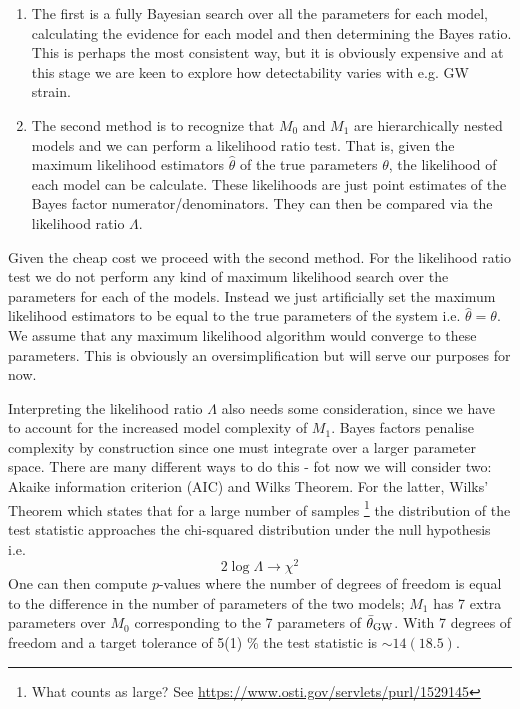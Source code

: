 \documentclass[fleqn,usenatbib,useAMS]{mnras}
\begin{document}
\begin{enumerate}
	\item The first is a fully Bayesian search over all the parameters for each model, calculating the evidence for each model and then determining the Bayes ratio. This is perhaps the most consistent way, but it is obviously expensive and at this stage we are keen to explore how detectability varies with e.g. GW strain.
	\item The second method is to recognize that $M_0$ and $M_1$ are hierarchically nested models and we can perform a likelihood ratio test. That is, given the maximum likelihood estimators $\hat{\theta}$ of the true parameters $\theta$, the likelihood of each model can be calculate. These likelihoods are just  point estimates of the Bayes factor numerator/denominators. They can then be compared via the likelihood ratio $\Lambda$. 
\end{enumerate}
Given the cheap cost we proceed with the second method. For the likelihood ratio test we do not perform any kind of maximum likelihood search over the parameters for each of the models. Instead we just artificially set the maximum likelihood estimators to be equal to the true parameters of the system i.e. $\hat{\theta} = \theta$. We assume that any maximum likelihood algorithm would converge to these parameters. This is obviously an oversimplification but will serve our purposes for now. \newline 


\noindent Interpreting the likelihood ratio $\Lambda$ also needs some consideration, since we have to account for the increased model complexity of $M_1$. Bayes factors penalise complexity by construction since one must integrate over a larger parameter space. There are many different ways to do this - fot now we will consider two: Akaike information criterion (AIC) and Wilks Theorem. For the latter, Wilks' Theorem which states that for a large number of samples \footnote{What counts as large? See \url{https://www.osti.gov/servlets/purl/1529145}} the distribution of the test statistic approaches the chi-squared distribution under the null hypothesis i.e. 
\begin{equation}
	2 \log \Lambda \rightarrow \chi^2
\end{equation}
One can then compute $p$-values where the number of degrees of freedom is equal to the difference in the number of parameters of the two models; $M_1$ has 7 extra parameters over $M_0$ corresponding to the 7 parameters of $\bar{\theta}_{\rm GW}$. With 7 degrees of freedom and a target tolerance of 5(1) \% the test statistic is $\sim 14 (18.5)$. \newline 
\end{document}
